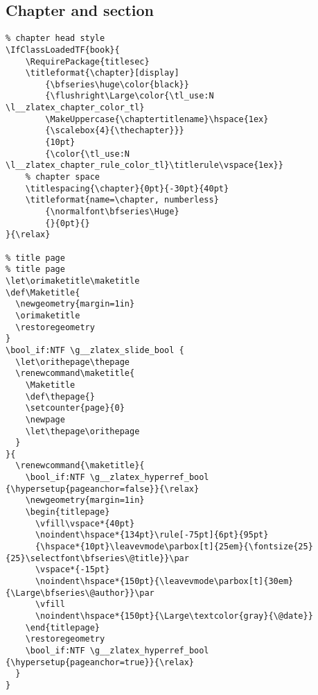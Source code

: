 \subsection{Chapter and section}
\begin{verbatim}
% chapter head style
\IfClassLoadedTF{book}{
    \RequirePackage{titlesec}
    \titleformat{\chapter}[display]
        {\bfseries\huge\color{black}}
        {\flushright\Large\color{\tl_use:N \l__zlatex_chapter_color_tl}
        \MakeUppercase{\chaptertitlename}\hspace{1ex}
        {\scalebox{4}{\thechapter}}}
        {10pt}
        {\color{\tl_use:N \l__zlatex_chapter_rule_color_tl}\titlerule\vspace{1ex}}
    % chapter space
    \titlespacing{\chapter}{0pt}{-30pt}{40pt}
    \titleformat{name=\chapter, numberless}
        {\normalfont\bfseries\Huge}
        {}{0pt}{}
}{\relax}

% title page
% title page
\let\orimaketitle\maketitle
\def\Maketitle{
  \newgeometry{margin=1in}
  \orimaketitle
  \restoregeometry
}
\bool_if:NTF \g__zlatex_slide_bool {
  \let\orithepage\thepage
  \renewcommand\maketitle{
    \Maketitle
    \def\thepage{}
    \setcounter{page}{0}
    \newpage
    \let\thepage\orithepage
  }
}{
  \renewcommand{\maketitle}{
    \bool_if:NTF \g__zlatex_hyperref_bool {\hypersetup{pageanchor=false}}{\relax}
    \newgeometry{margin=1in}
    \begin{titlepage}
      \vfill\vspace*{40pt}
      \noindent\hspace*{134pt}\rule[-75pt]{6pt}{95pt}
      {\hspace*{10pt}\leavevmode\parbox[t]{25em}{\fontsize{25}{25}\selectfont\bfseries\@title}}\par
      \vspace*{-15pt}
      \noindent\hspace*{150pt}{\leavevmode\parbox[t]{30em}{\Large\bfseries\@author}}\par
      \vfill
      \noindent\hspace*{150pt}{\Large\textcolor{gray}{\@date}}
    \end{titlepage}
    \restoregeometry
    \bool_if:NTF \g__zlatex_hyperref_bool {\hypersetup{pageanchor=true}}{\relax}
  }
}


\end{verbatim}
